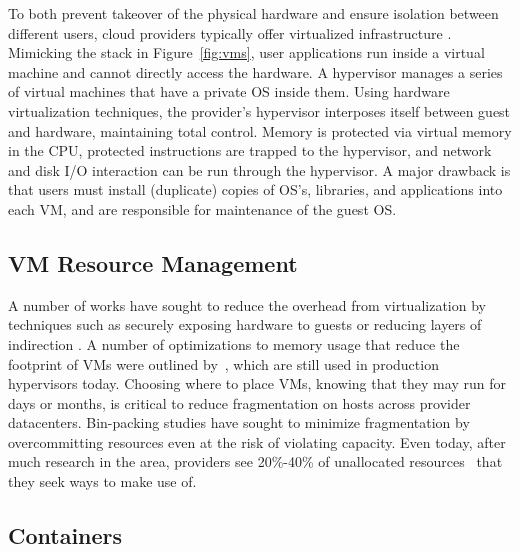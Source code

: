 To both prevent takeover of the physical hardware and ensure isolation between different users, cloud providers typically offer virtualized infrastructure \cite{xen}.
Mimicking the stack in Figure~\ref{fig:vms}, user applications run inside a virtual machine and cannot directly access the hardware.
A hypervisor manages a series of virtual machines that have a private OS inside them.
Using hardware virtualization techniques, the provider's hypervisor interposes itself between guest and hardware, maintaining total control.
Memory is protected via virtual memory in the CPU, protected instructions are trapped to the hypervisor, and network and disk I/O interaction can be run through the hypervisor.
A major drawback is that users must install (duplicate) copies of OS's, libraries, and applications into each VM, and are responsible for maintenance of the guest OS.


\subsection{VM Resource Management}

A number of works have sought to reduce the overhead from virtualization by techniques such as securely exposing hardware to guests \cite{dong2008sr} or reducing layers of indirection \cite{ben2010turtles}.
A number of optimizations to memory usage that reduce the footprint of VMs were outlined by~\cite{waldspurger2002memory}, which are still used in production hypervisors today.
Choosing where to place VMs, knowing that they may run for days or months, is critical to reduce fragmentation on hosts across provider datacenters.
Bin-packing studies have sought to minimize fragmentation \cite{binpacking} by overcommitting resources even at the risk of violating capacity.
Even today, after much research in the area, providers see 20\%-40\% of unallocated resources~\cite{fuerst2022memory} that they seek ways to make use of.

\subsection{Containers}

